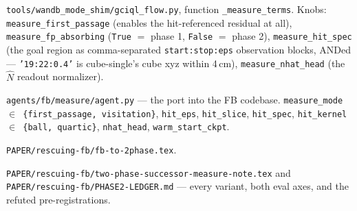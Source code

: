 \documentclass[11pt]{article}
\begin{document}
\begin{description}[leftmargin=0pt,style=nextline]
\item[JAX implementation] \texttt{tools/wandb\_mode\_shim/gciql\_flow.py}, function
  \texttt{\_measure\_terms}. Knobs: \texttt{measure\_first\_passage} (enables the
  hit-referenced residual at all), \texttt{measure\_fp\_absorbing}
  (\texttt{True} $=$ phase 1, \texttt{False} $=$ phase 2),
  \texttt{measure\_hit\_spec} (the goal region as comma-separated
  \texttt{start:stop:eps} observation blocks, ANDed --- \texttt{'19:22:0.4'} is
  cube-single's cube xyz within 4\,cm), \texttt{measure\_nhat\_head}
  (the $\hat N$ readout normalizer).
\item[Torch implementation] \texttt{agents/fb/measure/agent.py} --- the port into
  the FB codebase. \texttt{measure\_mode $\in$ \{first\_passage, visitation\}},
  \texttt{hit\_eps}, \texttt{hit\_slice}, \texttt{hit\_spec},
  \texttt{hit\_kernel $\in$ \{ball, quartic\}}, \texttt{nhat\_head},
  \texttt{warm\_start\_ckpt}.
\item[Full derivation] \texttt{PAPER/rescuing-fb/fb-to-2phase.tex}.
\item[Experimental record] \texttt{PAPER/rescuing-fb/two-phase-successor-measure-note.tex}
  and \texttt{PAPER/rescuing-fb/PHASE2-LEDGER.md} --- every variant, both eval
  axes, and the refuted pre-registrations.
\end{description}
\end{document}
